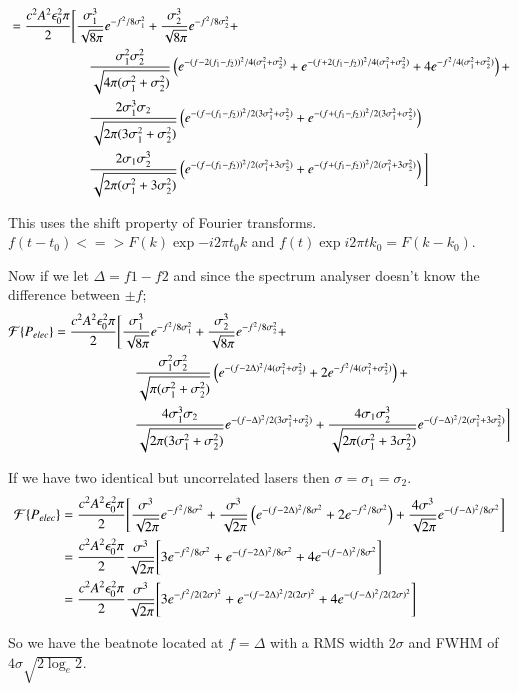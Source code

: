 \begin{align}
&= \frac{c^2A^2\epsilon_0^2 \pi}{2}\Bigg[\frac{\sigma_1^3}{\sqrt{8\pi}} e^{-f^2/8\sigma_1^2} + \frac{\sigma_2^3}{\sqrt{8\pi}} e^{-f^2/8\sigma_2^2} + \notag\\
&\quad\quad\quad\quad\quad\quad \frac{\sigma_1^2\sigma_2^2}{\sqrt{4\pi(\sigma_1^2+\sigma_2^2)}}\left(e^{-(f-2(f_1-f_2))^2/4(\sigma_1^2+\sigma_2^2)} + e^{-(f+2(f_1-f_2))^2/4(\sigma_1^2+\sigma_2^2)}+4e^{-f^2/4(\sigma_1^2+\sigma_2^2)} \right) +\notag\\
&\quad\quad\quad\quad\quad\quad  \frac{2\sigma_1^3\sigma_2}{\sqrt{2\pi(3\sigma_1^2+\sigma_2^2)}}\left(e^{-(f-(f_1-f_2))^2/2(3\sigma_1^2+\sigma_2^2)}+e^{-(f+(f_1-f_2))^2/2(3\sigma_1^2+\sigma_2^2)}\right)\notag\\
&\quad\quad\quad\quad\quad\quad  \frac{2\sigma_1\sigma_2^3}{\sqrt{2\pi(\sigma_1^2+3\sigma_2^2)}}\left(e^{-(f-(f_1-f_2))^2/2(\sigma_1^2+3\sigma_2^2)}+e^{-(f+(f_1-f_2))^2/2(\sigma_1^2+3\sigma_2^2)}\right)\Bigg]
\end{align}

This uses the shift property of Fourier transforms. $f(t-t_0) <=> F(k)\exp{-i2\pi t_0 k}$ and $f(t)\exp{i2\pi t k_0} = F(k-k_0)$.

Now if we let $\Delta=f1-f2$ and since the spectrum analyser doesn't know the difference between $\pm f$;
\begin{align}
\mathcal{F}\{P_{elec}\} &= \frac{c^2A^2\epsilon_0^2 \pi}{2}\Bigg[\frac{\sigma_1^3}{\sqrt{8\pi}} e^{-f^2/8\sigma_1^2} + \frac{\sigma_2^3}{\sqrt{8\pi}} e^{-f^2/8\sigma_2^2} + \notag\\
&\quad\quad\quad\quad\quad\quad \frac{\sigma_1^2\sigma_2^2}{\sqrt{\pi(\sigma_1^2+\sigma_2^2)}}\left(e^{-(f-2\Delta)^2/4(\sigma_1^2+\sigma_2^2)} + 2e^{-f^2/4(\sigma_1^2+\sigma_2^2)} \right) +\notag\\
&\quad\quad\quad\quad\quad\quad  \frac{4\sigma_1^3\sigma_2}{\sqrt{2\pi(3\sigma_1^2+\sigma_2^2)}}e^{-(f-\Delta)^2/2(3\sigma_1^2+\sigma_2^2)}+\frac{4\sigma_1\sigma_2^3}{\sqrt{2\pi(\sigma_1^2+3\sigma_2^2)}}e^{-(f-\Delta)^2/2(\sigma_1^2+3\sigma_2^2)}\Bigg]
\end{align}

If we have two identical but uncorrelated lasers then $\sigma=\sigma_1=\sigma_2$.
\begin{align}
\mathcal{F}\{P_{elec}\} &= \frac{c^2A^2\epsilon_0^2 \pi}{2}\Bigg[\frac{\sigma^3}{\sqrt{2\pi}} e^{-f^2/8\sigma^2} + \frac{\sigma^3}{\sqrt{2\pi}}\left(e^{-(f-2\Delta)^2/8\sigma^2} + 2e^{-f^2/8\sigma^2} \right) + \frac{4\sigma^3}{\sqrt{2\pi}}e^{-(f-\Delta)^2/8\sigma^2}\Bigg]\notag\\
&= \frac{c^2A^2\epsilon_0^2 \pi}{2}\frac{\sigma^3}{\sqrt{2\pi}}\Bigg[3e^{-f^2/8\sigma^2} + e^{-(f-2\Delta)^2/8\sigma^2} + 4e^{-(f-\Delta)^2/8\sigma^2}\Bigg]\notag\\
&= \frac{c^2A^2\epsilon_0^2 \pi}{2}\frac{\sigma^3}{\sqrt{2\pi}}\Bigg[3e^{-f^2/2(2\sigma)^2} + e^{-(f-2\Delta)^2/2(2\sigma)^2} + 4e^{-(f-\Delta)^2/2(2\sigma)^2}\Bigg]
\end{align}

So we have the beatnote located at $f=\Delta$ with a RMS width $2\sigma$ and FWHM of $4\sigma\sqrt{2\log_e{2}}$.
